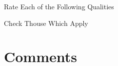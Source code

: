 \documentclass[english,pdf,pagemark,stamp,fill,style=code128,globalid=034]{sdaps}
\begin{document}
\begin{questionnaire}[noinfo]
\begin{multicols}{2}
\begin{markgroup}{Rate Each of the Following Qualities}
    \end{markgroup}

\columnbreak

  \begin{choicequestion}[1]{Check Thouse Which Apply}
  \end{choicequestion}
\vspace{1 mm}

\end{multicols}

    \section{Comments}


  \end{questionnaire}
\end{document}
